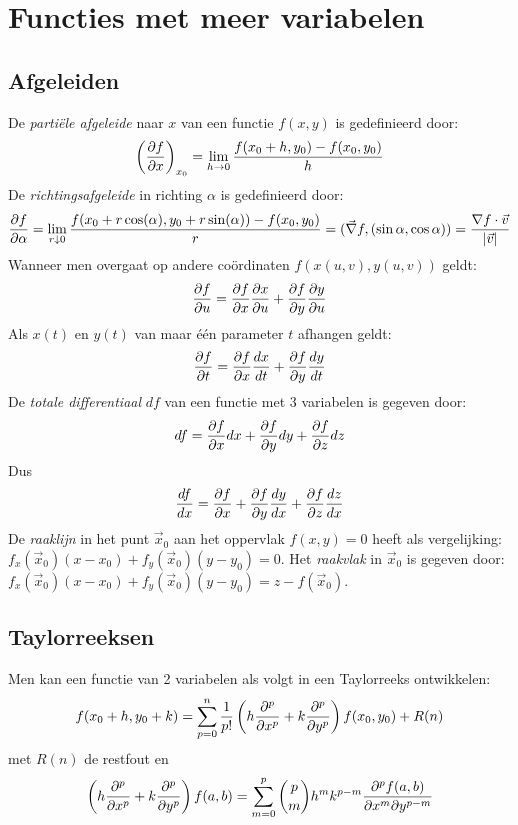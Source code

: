 \documentclass[twoside]{report}
\begin{document}
\section{Functies met meer variabelen}
\subsection{Afgeleiden}
De {\it parti\"ele afgeleide} naar $x$ van een functie $f(x,y)$ is gedefinieerd
door:
\[
\left(\frac{\partial f}{\partial x}\right)_{x_0}=\lim_{h\rightarrow0}\frac{f(x_0+h,y_0)-f(x_0,y_0)}{h}
\]
De {\it richtingsafgeleide} in richting $\alpha$ is gedefinieerd door:
\[
\frac{\partial f}{\partial \alpha}=\lim_{r\downarrow0}\frac{f(x_0+r\cos(\alpha),y_0+r\sin(\alpha))-f(x_0,y_0)}{r}=
(\vec{\nabla}f,(\sin\alpha,\cos\alpha))=\frac{\nabla f\cdot\vec{v}}{|\vec{v}|}
\]
Wanneer men overgaat op andere co\"ordinaten $f(x(u,v),y(u,v))$ geldt:
\[
\frac{\partial f}{\partial u}=\frac{\partial f}{\partial x}\frac{\partial x}{\partial u}+\frac{\partial f}{\partial y}\frac{\partial y}{\partial u}
\]
Als $x(t)$ en $y(t)$ van maar \'e\'en parameter $t$ afhangen geldt:
\[
\frac{\partial f}{\partial t}=\frac{\partial f}{\partial x}\frac{dx}{dt}+\frac{\partial f}{\partial y}\frac{dy}{dt}
\]
De {\it totale differentiaal} $df$ van een functie met 3 variabelen is
gegeven door:
\[
df=\frac{\partial f}{\partial x}dx+\frac{\partial f}{\partial y}dy+\frac{\partial f}{\partial z}dz
\]
Dus
\[
\frac{df}{dx}=\frac{\partial f}{\partial x}+\frac{\partial f}{\partial y}\frac{dy}{dx}+\frac{\partial f}{\partial z}\frac{dz}{dx}
\]
De {\it raaklijn} in het punt $\vec{x}_0$ aan het oppervlak $f(x,y)=0$ heeft
als vergelijking:\\ $f_x(\vec{x}_0)(x-x_0)+f_y(\vec{x}_0)(y-y_0)=0$.
\npar
Het {\it raakvlak} in $\vec{x}_0$ is gegeven door:
$f_x(\vec{x}_0)(x-x_0)+f_y(\vec{x}_0)(y-y_0)=z-f(\vec{x}_0)$.

\subsection{Taylorreeksen}
Men kan een functie van 2 variabelen als volgt in een Taylorreeks ontwikkelen:
\[
f(x_0+h,y_0+k)=\sum\limits_{p=0}^n \frac{1}{p!}
\left(h\frac{\partial ^p}{\partial x^p}+k\frac{\partial ^p}{\partial y^p}\right)f(x_0,y_0)+R(n)
\]
met $R(n)$ de restfout en
\[
\left(h\frac{\partial ^p}{\partial x^p}+k\frac{\partial ^p}{\partial y^p}\right)f(a,b)=\sum\limits_{m=0}^p{p\choose m}
h^mk^{p-m}\frac{\partial^pf(a,b)}{\partial x^m\partial y^{p-m}}
\]
\end{document}
